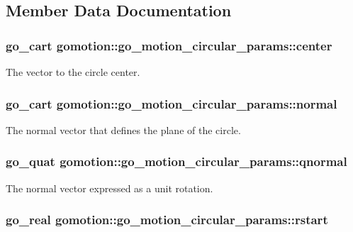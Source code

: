 \subsection{Member Data Documentation}
\hypertarget{structgomotion_1_1go__motion__circular__params_afcf8dda6a72f29ce49a61130adbf3971}{
\subsubsection[{center}]{\setlength{\rightskip}{0pt plus 5cm}go\-\_\-cart gomotion\-::go\-\_\-motion\-\_\-circular\-\_\-params\-::center}}\label{structgomotion_1_1go__motion__circular__params_afcf8dda6a72f29ce49a61130adbf3971}
The vector to the circle center. \hypertarget{structgomotion_1_1go__motion__circular__params_af933e19d1dba3641d570a3aa42b9969b}{
\subsubsection[{normal}]{\setlength{\rightskip}{0pt plus 5cm}go\-\_\-cart gomotion\-::go\-\_\-motion\-\_\-circular\-\_\-params\-::normal}}\label{structgomotion_1_1go__motion__circular__params_af933e19d1dba3641d570a3aa42b9969b}
The normal vector that defines the plane of the circle. \hypertarget{structgomotion_1_1go__motion__circular__params_abd5283624621e9fb218671e9996eb3c3}{
\subsubsection[{qnormal}]{\setlength{\rightskip}{0pt plus 5cm}go\-\_\-quat gomotion\-::go\-\_\-motion\-\_\-circular\-\_\-params\-::qnormal}}\label{structgomotion_1_1go__motion__circular__params_abd5283624621e9fb218671e9996eb3c3}
The normal vector expressed as a unit rotation. \hypertarget{structgomotion_1_1go__motion__circular__params_aeee40430ac2667fef1fc6eba842427b7}{
\subsubsection[{rstart}]{\setlength{\rightskip}{0pt plus 5cm}go\-\_\-real gomotion\-::go\-\_\-motion\-\_\-circular\-\_\-params\-::rstart}}\label{structgomotion_1_1go__motion__circular__params_aeee40430ac2667fef1fc6eba842427b7}
